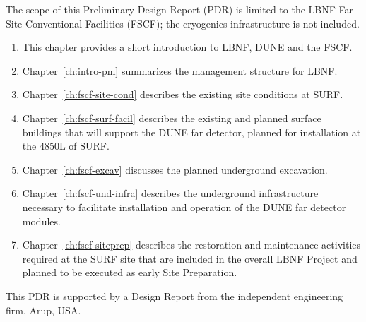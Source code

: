 The scope of this Preliminary Design Report (PDR) is limited to the LBNF Far Site Conventional Facilities (FSCF); the cryogenics infrastructure is not included.
\begin{enumerate}
\item This chapter provides a short introduction to LBNF, DUNE and the FSCF.
\item Chapter~\ref{ch:intro-pm} summarizes the management structure for LBNF.
\item Chapter~\ref{ch:fscf-site-cond} describes the existing site conditions at SURF. 
\item Chapter~\ref{ch:fscf-surf-facil} describes the existing and planned surface buildings that will support the DUNE far detector, planned for installation at the 4850L of SURF.
\item Chapter~\ref{ch:fscf-excav} discusses the planned underground excavation. 
\item Chapter~\ref{ch:fscf-und-infra} describes the underground infrastructure necessary to facilitate installation and operation of the DUNE far detector modules.
\item Chapter~\ref{ch:fscf-siteprep} describes the restoration and maintenance activities required at the SURF site that
are included in the overall LBNF Project and planned to be executed as early Site Preparation.
\end{enumerate}

This PDR is supported by a Design Report from the independent engineering firm, Arup, USA\cite{arup:fscf100pdr}.


